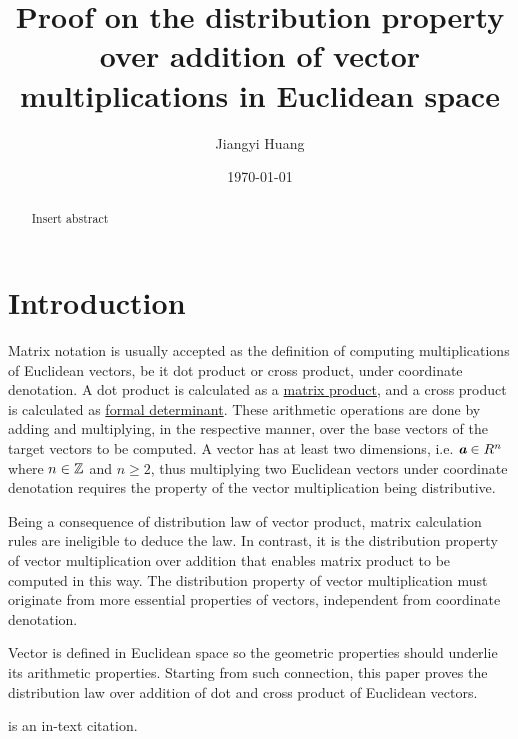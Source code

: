 \documentclass{article}
\title{Proof on the distribution property over addition of vector multiplications in Euclidean space}
\author{Jiangyi Huang}
\date{\today}
\begin{document}
\maketitle

\begin{abstract}
Insert abstract
\end{abstract}


\section{Introduction}

Matrix notation is usually accepted as the definition of computing multiplications of Euclidean vectors, be it dot product or cross product, under coordinate denotation. A dot product is calculated as a \href{https://en.wikipedia.org/wiki/Dot_product#Algebraic_definition}{matrix product}, and a cross product is calculated as \href{https://en.wikipedia.org/wiki/Cross_product#Coordinate_notation}{formal determinant}. These arithmetic operations are done by adding and multiplying, in the respective manner, over the base vectors of the target vectors to be computed. A vector has at least two dimensions, i.e. $\textbf{\em a} \in R^n$ where $n \in \mathbb{Z}$ and $n \geq 2$, thus multiplying two Euclidean vectors under coordinate denotation requires the property of the vector multiplication being distributive.

Being a consequence of distribution law of vector product, matrix calculation rules are ineligible to deduce the law. In contrast, it is the distribution property of vector multiplication over addition that enables matrix product to be computed in this way. The distribution property of vector multiplication must originate from more essential properties of vectors, independent from coordinate denotation. 

Vector is defined in Euclidean space so the geometric properties should underlie its arithmetic properties. Starting from such connection, this paper proves the distribution law over addition of dot and cross product of Euclidean vectors.

\mydef \cite{einstein} is an in-text citation.\rm
\end{document}
